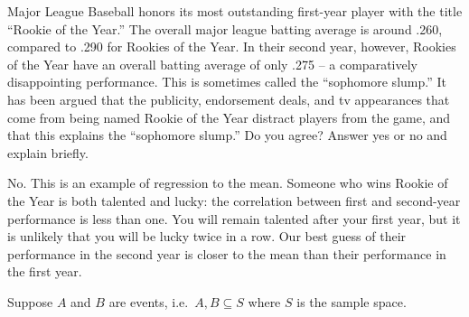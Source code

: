 \documentclass[addpoints,12pt]{exam}
\begin{document}
\begin{questions}



\question[10] Major League Baseball honors its most outstanding first-year player with the title ``Rookie of the Year.'' The overall major league batting average is around .260, compared to .290 for Rookies of the Year. In their second year, however, Rookies of the Year have an overall batting average of only .275 -- a comparatively disappointing performance. This is sometimes called the ``sophomore slump.'' It has been argued that the publicity, endorsement deals, and tv appearances that come from being named Rookie of the Year distract players from the game, and that this explains the ``sophomore slump.'' Do you agree? Answer yes or no and explain briefly.
\begin{solution}[2in]
No. This is an example of regression to the mean. Someone who wins Rookie of the Year is both talented and lucky: the correlation between first and second-year performance is less than one. You will remain talented after your first year, but it is unlikely that you will be lucky twice in a row. Our best guess of their performance in the second year is closer to the mean than their performance in the first year.
\end{solution}



\question Suppose $A$ and $B$ are events, i.e.\ $A,B \subseteq S$ where $S$ is the sample space.
\end{questions}
\end{document}
